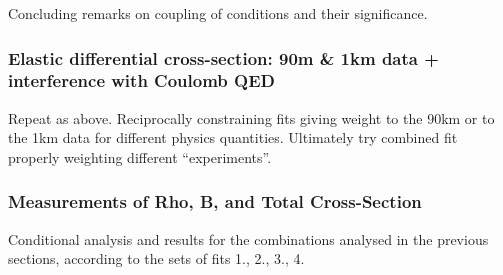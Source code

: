 Concluding remarks on coupling of conditions and their significance.


\subsubsection{Elastic differential cross-section: 90m \& 1km data + interference with Coulomb QED}

Repeat as above. Reciprocally constraining fits giving weight to the 90km or to the 1km data
for different physics quantities. Ultimately try combined fit properly weighting different
“experiments”.


\subsubsection{Measurements of Rho, B, and Total Cross-Section}

Conditional analysis and results for the combinations analysed in the previous sections,
according to the sets of fits 1., 2., 3., 4.
